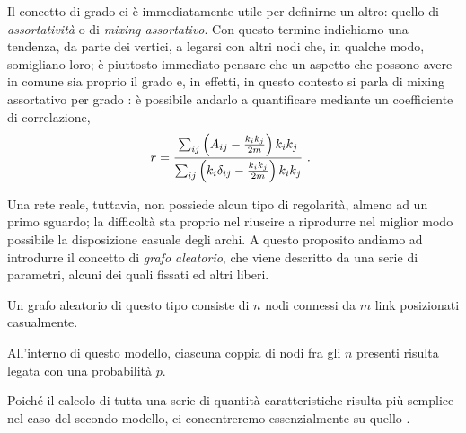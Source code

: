 Il concetto di grado ci è immediatamente utile per definirne un altro: quello di \emph{assortatività} o di \emph{mixing assortativo}.
 Con questo termine indichiamo una tendenza, da parte dei vertici, a legarsi con altri nodi che, in qualche modo, somigliano loro; è piuttosto immediato pensare che un aspetto che possono avere in comune sia proprio il grado e, in effetti, in questo contesto si parla di mixing assortativo per grado \cite{Newman}: è possibile andarlo a quantificare mediante un coefficiente di correlazione,
\begin{equation}
	r = \frac{ \sum_{ij} \left( A_{ij} - \frac{k_i k_j}{2m} \right) k_i k_j}{\sum_{ij} \left(k_i \delta_{ij} - \frac{k_i k_j}{2m} \right) k_i k_j} $ . $
\end{equation}

\medskip
Una rete reale, tuttavia, non possiede alcun tipo di regolarità, almeno ad un primo sguardo; la difficoltà sta proprio nel riuscire a riprodurre nel miglior modo possibile la disposizione casuale degli archi. A questo proposito andiamo ad introdurre il concetto di \emph{grafo aleatorio}, che viene descritto da una serie di parametri, alcuni dei quali fissati ed altri liberi.
\begin{definizione}
Un grafo aleatorio di questo tipo consiste di $ n $ nodi connessi da $ m $ link posizionati casualmente.
\end{definizione}
\begin{definizione}
All'interno di questo modello, ciascuna coppia di nodi fra gli $ n $ presenti risulta legata con una probabilità $ p $.
\end{definizione}
Poiché il calcolo di tutta una serie di quantità caratteristiche risulta più semplice nel caso del secondo modello, ci concentreremo essenzialmente su quello \cite{Barabasi}. \\
